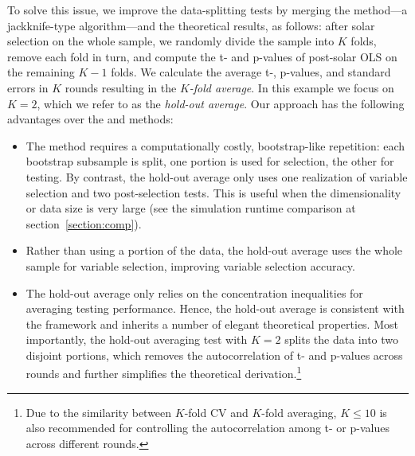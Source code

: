 \documentclass[11pt,authoryear]{elsarticle}
\begin{document}
To solve this issue, we improve the data-splitting tests by merging the \citet{bousquet2002stability} method---a jackknife-type algorithm---and the \citet{diciccio2020exact} theoretical results, as follows: after solar selection on the whole sample, we randomly divide the sample into $K$ folds, remove each fold in turn, and compute the t- and p-values of post-solar OLS on the remaining $K-1$ folds. We calculate the average t-, p-values, and standard errors in $K$ rounds resulting in the \emph{$K$-fold average}. In this example we focus on $K=2$, which we refer to as the \emph{hold-out average}. Our approach has the following advantages over the \citet{wasserman2009high} and \citet{meinshausen2009p} methods:

\begin{itemize}
  \item The \citet{meinshausen2009p} method requires a computationally costly, bootstrap-like repetition: each bootstrap subsample is split, one portion is used for selection, the  other for testing. By contrast, the hold-out average only uses one realization of variable selection and two post-selection tests. This is useful when the dimensionality or data size is very large (see the simulation runtime comparison at section~\ref{section:comp}).
  \item Rather than using a portion of the data, the hold-out average uses the whole sample for variable selection, improving variable selection accuracy.
  \item The hold-out average only relies on the concentration inequalities for averaging testing performance. Hence, the hold-out average is consistent with the \citet{diciccio2020exact} framework and inherits a number of elegant theoretical properties. Most importantly, the hold-out averaging test with $K=2$ splits the data into two disjoint portions, which removes the autocorrelation of t- and p-values across rounds and further simplifies the \citet{diciccio2020exact} theoretical derivation.\footnote{Due to the similarity between $K$-fold CV and $K$-fold averaging, $K \leqslant 10$ \citep{friedman2001elements} is also recommended for controlling the autocorrelation among t- or p-values across different rounds.}
\end{itemize}
\end{document}
